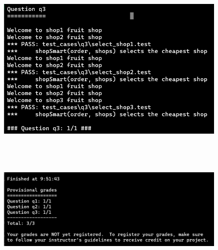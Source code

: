 \documentclass[a4paper,12pt,UTF8]{article}
\begin{document}
\begin{flushleft}
{{\begin{figure}[h]
        \end{figure}
        \begin{figure}[h]
            \centering
        \includegraphics[width=12cm,height=7cm]{3}
        \end{figure}
        \begin{figure}[h]
            \centering
        \includegraphics[width=12cm,height=7cm]{4}
        \end{figure}
       }
    }
\end{flushleft}
\end{document}
